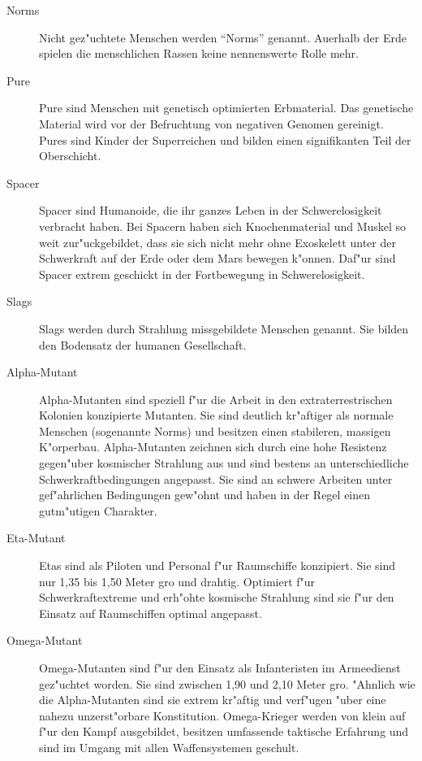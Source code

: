 \begin{description}
\item [Norms] Nicht gez"uchtete Menschen werden ``Norms'' genannt. Au\3erhalb der Erde spielen die menschlichen Rassen keine nennenswerte 
      Rolle mehr.
\item [Pure] Pure sind Menschen mit genetisch optimierten Erbmaterial. Das genetische Material wird vor der
      Befruchtung von negativen Genomen gereinigt. Pures sind Kinder der Superreichen und bilden einen signifikanten Teil der Oberschicht.
\item [Spacer] Spacer sind Humanoide, die ihr ganzes Leben in der Schwerelosigkeit verbracht haben. Bei Spacern haben
      sich Knochenmaterial und Muskel so weit zur"uckgebildet, dass sie sich nicht mehr ohne Exoskelett unter der Schwerkraft auf der Erde oder dem Mars bewegen k"onnen. Daf"ur sind Spacer extrem geschickt in der Fortbewegung in Schwerelosigkeit.
\item [Slags] Slags werden durch Strahlung missgebildete Menschen genannt. Sie bilden den Bodensatz der humanen Gesellschaft.
\item [Alpha-Mutant] Alpha-Mutanten sind speziell f"ur die Arbeit in den extraterrestrischen Kolonien konzipierte Mutanten. Sie sind 
      deutlich kr"aftiger als normale Menschen (sogenannte Norms) und besitzen einen stabileren, massigen K"orperbau. Alpha-Mutanten zeichnen sich durch eine hohe Resistenz gegen"uber kosmischer Strahlung aus und sind bestens an unterschiedliche Schwerkraftbedingungen angepasst. Sie sind an schwere Arbeiten unter gef"ahrlichen Bedingungen gew"ohnt und haben in der Regel einen gutm"utigen Charakter.
\item [Eta-Mutant] Etas sind als Piloten und Personal f"ur Raumschiffe konzipiert. Sie sind nur 1,35 bis 1,50 Meter gro\3
      und drahtig. Optimiert f"ur Schwerkraftextreme und erh"ohte kosmische Strahlung sind sie f"ur den Einsatz auf Raumschiffen optimal angepasst.
\item [Omega-Mutant] Omega-Mutanten sind f"ur den Einsatz als Infanteristen im Armeedienst gez"uchtet worden. Sie sind zwischen 1,90 und 2,10 
      Meter gro\3. "Ahnlich wie die Alpha-Mutanten sind sie extrem kr"aftig und verf"ugen "uber eine nahezu unzerst"orbare Konstitution. Omega-Krieger werden von klein auf f"ur den Kampf ausgebildet, besitzen umfassende taktische Erfahrung und sind im Umgang mit allen Waffensystemen geschult.
\end{description}



